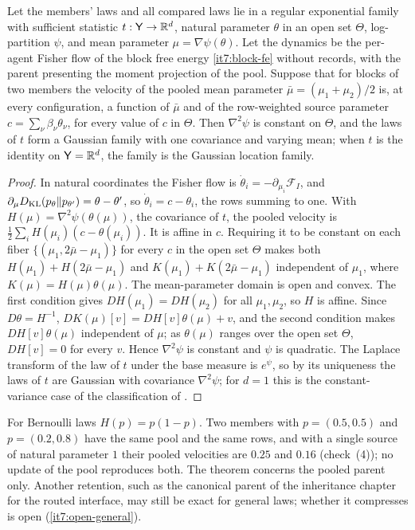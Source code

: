 \documentclass[11pt,letterpaper]{report}
\begin{document}
Let the members' laws and all compared laws lie in a regular exponential family with sufficient statistic $t:\mathsf Y\to\mathbb R^d$, natural parameter $\theta$ in an open set $\Theta$, log-partition $\psi$, and mean parameter $\mu=\nabla\psi(\theta)$. Let the dynamics be the per-agent Fisher flow of the block free energy \cref{it7:block-fe} without records, with the parent presenting the moment projection of the pool. Suppose that for blocks of two members the velocity of the pooled mean parameter $\bar\mu=(\mu_1+\mu_2)/2$ is, at every configuration, a function of $\bar\mu$ and of the row-weighted source parameter $c=\sum_\nu\beta_\nu\theta_\nu$, for every value of $c$ in $\Theta$. Then $\nabla^2\psi$ is constant on $\Theta$, and the laws of $t$ form a Gaussian family with one covariance and varying mean; when $t$ is the identity on $\mathsf Y=\mathbb R^d$, the family is the Gaussian location family.
\begin{proof}
In natural coordinates the Fisher flow is $\dot\theta_i=-\partial_{\mu_i}\mathcal F_I$, and $\partial_\mu D_{\mathrm{KL}}(p_\theta\Vert p_{\theta'})=\theta-\theta'$, so $\dot\theta_i=c-\theta_i$, the rows summing to one. With $H(\mu)=\nabla^2\psi(\theta(\mu))$, the covariance of $t$, the pooled velocity is $\frac12\sum_iH(\mu_i)(c-\theta(\mu_i))$. It is affine in $c$. Requiring it to be constant on each fiber $\{(\mu_1,2\bar\mu-\mu_1)\}$ for every $c$ in the open set $\Theta$ makes both $H(\mu_1)+H(2\bar\mu-\mu_1)$ and $K(\mu_1)+K(2\bar\mu-\mu_1)$ independent of $\mu_1$, where $K(\mu)=H(\mu)\theta(\mu)$. The mean-parameter domain is open and convex. The first condition gives $DH(\mu_1)=DH(\mu_2)$ for all $\mu_1,\mu_2$, so $H$ is affine. Since $D\theta=H^{-1}$, $DK(\mu)[v]=DH[v]\theta(\mu)+v$, and the second condition makes $DH[v]\theta(\mu)$ independent of $\mu$; as $\theta(\mu)$ ranges over the open set $\Theta$, $DH[v]=0$ for every $v$. Hence $\nabla^2\psi$ is constant and $\psi$ is quadratic. The Laplace transform of the law of $t$ under the base measure is $e^{\psi}$, so by its uniqueness the laws of $t$ are Gaussian with covariance $\nabla^2\psi$; for $d=1$ this is the constant-variance case of the classification of \citet{Morris1982}.
\end{proof}

For Bernoulli laws $H(p)=p(1-p)$. Two members with $p=(0.5,0.5)$ and $p=(0.2,0.8)$ have the same pool and the same rows, and with a single source of natural parameter $1$ their pooled velocities are $0.25$ and $0.16$ (check~(4)); no update of the pool reproduces both. The theorem concerns the pooled parent only. Another retention, such as the canonical parent of the inheritance chapter for the routed interface, may still be exact for general laws; whether it compresses is open (\cref{it7:open-general}).
\end{document}
